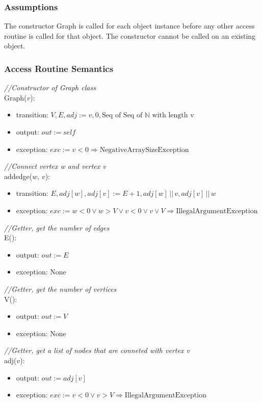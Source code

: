\documentclass[12pt]{article}
\begin{document}
\subsubsection* {Assumptions}

The constructor Graph is called for each object instance before any other access routine is called for that object.  The constructor cannot be called on
an existing object.

\subsubsection* {Access Routine Semantics}

\noindent \textit{//Constructor of Graph class}\\
Graph($v$):
\begin{itemize}
\item transition: $V, E, adj := v, 0, \mbox{Seq of Seq of   }\mathbb{N}\mbox{ with length v}$
\item output: $out := \mathit{self}$
\item exception: $exc := v < 0 \Rightarrow \mbox{NegativeArraySizeException}$
\end{itemize}

\noindent \textit{//Connect vertex w and vertex v}\\
\noindent addedge($w$, $v$):
\begin{itemize}
\item transition: $E, adj[w], adj[v] := E + 1, adj[w] \,||\, v, adj[v] \,||\, w$
\item exception: $exc := w < 0 \lor w > V  \lor v < 0 \lor v \lor V \Rightarrow \mbox{IllegalArgumentException}$
\end{itemize}

\noindent \textit{//Getter, get the number of edges}\\
\noindent E():
\begin{itemize}
\item output: $out := E$
\item exception: None
\end{itemize}

\noindent \textit{//Getter, get the number of vertices}\\
\noindent V():
\begin{itemize}
\item output: $out := V$
\item exception: None
\end{itemize}

\noindent \textit{//Getter, get a list of nodes that are conneted with vertex v}\\
\noindent adj($v$):
\begin{itemize}
\item output: $out := adj[v]$
\item exception: $exc := v < 0 \lor v > V \Rightarrow \mbox{IllegalArgumentException}$
\end{itemize}
\newpage
\end{document}
